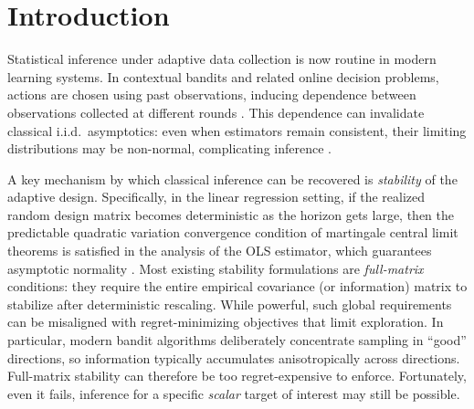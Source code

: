 \documentclass[11pt]{article}
\begin{document}
\section{Introduction}
Statistical inference under adaptive data collection is now routine in modern learning systems. In contextual bandits and related online decision problems, actions are chosen using past observations, inducing dependence between observations collected at different rounds \citep{auer2002finite, li2010contextual, lattimore2020, sutton2018reinforcement}. This dependence can invalidate classical i.i.d.\ asymptotics: even when estimators remain consistent, their limiting distributions may be non-normal, complicating inference \citep{vanderVaart1998asymptotic, hall1980, hadad2021confidence, bibaut2025demystifying}.

A key mechanism by which classical inference can be recovered is \emph{stability} of the adaptive design. Specifically, in the linear regression setting, if the realized random design matrix becomes deterministic as the horizon gets large, then the predictable quadratic variation convergence condition of martingale central limit theorems is satisfied in the analysis of the OLS estimator, which guarantees asymptotic normality \citep{laiweiaos1982}. 
Most existing stability formulations are \emph{full-matrix} conditions: they require the entire empirical covariance (or information) matrix to stabilize after deterministic rescaling. While powerful, such global requirements can be misaligned with regret-minimizing objectives that limit exploration. In particular, modern bandit algorithms deliberately concentrate sampling in ``good'' directions, so information typically accumulates anisotropically across directions. Full-matrix stability can therefore be too regret-expensive to enforce. Fortunately, even it fails, inference for a specific \emph{scalar} target of interest may still be possible.
\end{document}
